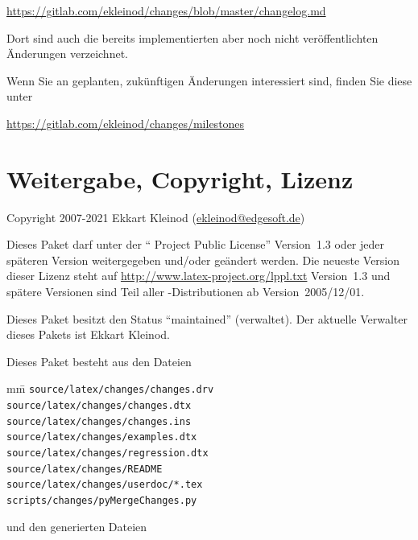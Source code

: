 \url{https://gitlab.com/ekleinod/changes/blob/master/changelog.md}

Dort sind auch die bereits implementierten aber noch nicht veröffentlichten Änderungen verzeichnet.

Wenn Sie an geplanten, zukünftigen Änderungen interessiert sind, finden Sie diese unter

\url{https://gitlab.com/ekleinod/changes/milestones}


\cleardoublepage
\section{Weitergabe, Copyright, Lizenz}

Copyright 2007-2021 Ekkart Kleinod (\href{mailto:ekleinod@edgesoft.de}{ekleinod@edgesoft.de})

Dieses Paket darf unter der "` Project Public License"' Version~1.3 oder jeder späteren Version weitergegeben und/oder geändert werden.
Die neueste Version dieser Lizenz steht auf \url{http://www.latex-project.org/lppl.txt} Version~1.3 und spätere Versionen sind Teil aller -Distributionen ab Version~2005/12/01.

Dieses Paket besitzt den Status "`maintained"' (verwaltet).
Der aktuelle Verwalter dieses Pakets ist Ekkart Kleinod.

Dieses Paket besteht aus den Dateien

\begin{tabbing}
	mm\=\kill
	\>\texttt{source/latex/changes/changes.drv}\\
	\>\texttt{source/latex/changes/changes.dtx}\\
	\>\texttt{source/latex/changes/changes.ins}\\
	\>\texttt{source/latex/changes/examples.dtx}\\
	\>\texttt{source/latex/changes/regression.dtx}\\
	\>\texttt{source/latex/changes/README}\\
	\>\texttt{source/latex/changes/userdoc/*.tex}\\

	\>\texttt{scripts/changes/pyMergeChanges.py}
\end{tabbing}


und den generierten Dateien

